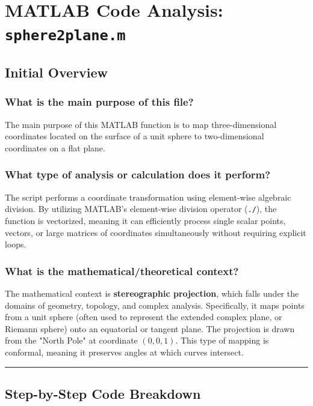 
\chapter{MATLAB Code Analysis: \texttt{sphere2plane.m}}
\date{}
\maketitle

\section{Initial Overview}

\subsection{What is the main purpose of this file?}
The main purpose of this MATLAB function is to map three-dimensional coordinates located on the surface of a unit sphere to two-dimensional coordinates on a flat plane. 

\subsection{What type of analysis or calculation does it perform?}
The script performs a coordinate transformation using element-wise algebraic division. By utilizing MATLAB's element-wise division operator (\texttt{./}), the function is vectorized, meaning it can efficiently process single scalar points, vectors, or large matrices of coordinates simultaneously without requiring explicit loops.

\subsection{What is the mathematical/theoretical context?}
The mathematical context is \textbf{stereographic projection}, which falls under the domains of geometry, topology, and complex analysis. Specifically, it maps points from a unit sphere (often used to represent the extended complex plane, or Riemann sphere) onto an equatorial or tangent plane. The projection is drawn from the "North Pole" at coordinate $(0,0,1)$. This type of mapping is conformal, meaning it preserves angles at which curves intersect.

\vspace{1em}
\hrule
\vspace{1em}

\section{Step-by-Step Code Breakdown}

